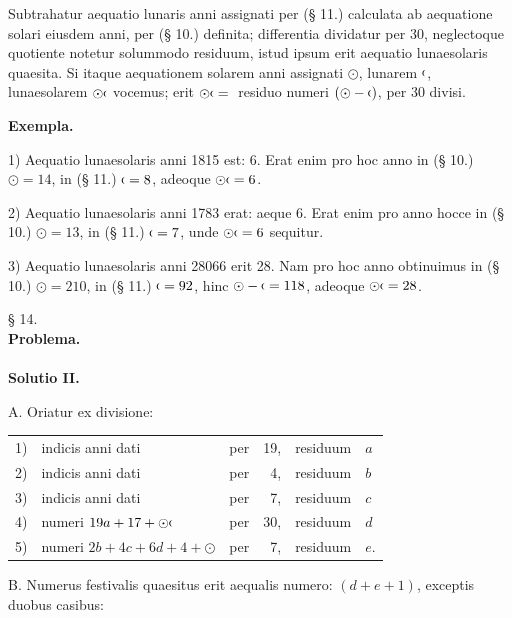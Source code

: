\noindent\hspace*{\parindent}Subtrahatur aequatio lunaris anni assignati per (§ 11.) calculata ab aequatione solari eiusdem anni, per (§ 10.) definita; differentia dividatur per 30,
\HistoricalFoot{}{26\textsuperscript{*}}
\clearpage{}
\noindent neglectoque quotiente notetur solummodo residuum, istud ipsum erit aequatio lunaesolaris quaesita. Si itaque aequationem solarem anni assignati $\odot$, lunarem $\ChronMoon$, lunaesolarem $\odot\ChronMoon$ vocemus; erit $\odot\ChronMoon={}$ residuo numeri $(\odot-\ChronMoon)$, per 30 divisi.
\begin{center}\textbf{Exempla.}\end{center}
\noindent\hspace*{\parindent}1) Aequatio lunaesolaris anni 1815 est: 6. Erat enim pro hoc anno in (§ 10.) $\odot=14$, in (§ 11.) $\ChronMoon=8$, adeoque $\odot\ChronMoon=6$.

2) Aequatio lunaesolaris anni 1783 erat: aeque 6. Erat enim pro anno hocce in (§ 10.) $\odot=13$, in (§ 11.) $\ChronMoon=7$, unde $\odot\ChronMoon=6$ sequitur.

3) Aequatio lunaesolaris anni 28066 erit 28. Nam pro hoc anno obtinuimus in (§ 10.) $\odot=210$, in (§ 11.) $\ChronMoon=92$, hinc $\odot-\ChronMoon=118$, adeoque $\odot\ChronMoon=28$.
\begin{center}
§ 14.\\[.7em]
\textbf{Problema.}\\[.7em]
\\[.7em]
\textbf{Solutio II.}
\end{center}
\noindent\hspace*{\parindent}A. Oriatur ex divisione:
\begin{center}
\begin{tabular}{@{}r l l r l l@{}}
1)&indicis anni dati&per&19,&residuum&$a$\\
2)&indicis anni dati&per&4,&residuum&$b$\\
3)&indicis anni dati&per&7,&residuum&$c$\\
4)&numeri $19a+17+\odot\ChronMoon$&per&30,&residuum&$d$\\
5)&numeri $2b+4c+6d+4+\odot$&per&7,&residuum&$e$.
\end{tabular}
\end{center}
\noindent\hspace*{\parindent}B. Numerus festivalis quaesitus erit aequalis numero: $(d+e+1)$, exceptis duobus casibus:

